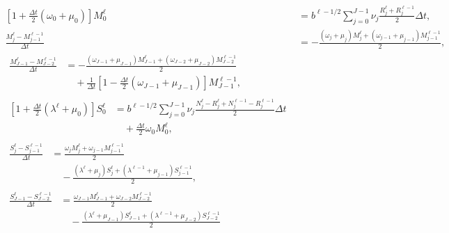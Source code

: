 \documentclass[USenglish]{article}
\begin{document}
\begin{subequations}
  \label{numerics_age_and_time_since_entry_structured_agg_tse}
  \begin{align}
    \left[1 + \frac{\Delta t}{2} (\omega_0 + \mu_0)\right] M_0^{\ell}
    &= b^{\ell - 1 / 2}
    \sum_{j = 0}^{J - 1} \nu_j \frac{R_j^{\ell} + R_j^{\ell - 1}}{2}
    \Delta t,
    \\
    \frac{M_j^{\ell} - M_{j - 1}^{\ell - 1}}{\Delta t}
    &=
    - \frac{(\omega_j + \mu_j) M_j^{\ell}
      + (\omega_{j - 1} + \mu_{j - 1}) M_{j - 1}^{\ell - 1}}
    {2},
    \\
    \begin{split}
      \frac{M_{J - 1}^{\ell} - M_{J - 2}^{\ell - 1}}{\Delta t}
      &= - \frac{(\omega_{J - 1} + \mu_{J - 1}) M_{J - 1}^{\ell}
        + (\omega_{J - 2} + \mu_{J - 2}) M_{J - 2}^{\ell - 1}}
      {2}
      \\ & \quad {}
      +  \frac{1}{\Delta t} \left[
        1 - \frac{\Delta t}{2} (\omega_{J - 1} + \mu_{J - 1})
      \right] M_{J - 1}^{\ell - 1},
    \end{split}
    \\
    \begin{split}
      \left[1 + \frac{\Delta t}{2} (\lambda^{\ell} + \mu_0)\right] S_0^{\ell}
      &= b^{\ell - 1 / 2}
      \sum_{j = 0}^{J - 1} \nu_j
      \frac{N_j^{\ell} - R_j^{\ell} + N_j^{\ell - 1} - R_j^{\ell - 1}}
      {2}
      \Delta t
      \\ & \quad {}
      + \frac{\Delta t}{2} \omega_0 M_0^{\ell},
    \end{split}
    \\
    \begin{split}
      \frac{S_j^{\ell} - S_{j - 1}^{\ell - 1}}{\Delta t}
      &= \frac{\omega_j M_j^{\ell}
        + \omega_{j - 1} M_{j - 1}^{\ell - 1}}
      {2}
      \\ & \quad {}
      - \frac{(\lambda^{\ell} + \mu_j) S_j^{\ell}
        + (\lambda^{\ell - 1} + \mu_{j - 1}) S_{j - 1}^{\ell - 1}}
      {2},
    \end{split}
    \\
    \begin{split}
      \frac{S_{J - 1}^{\ell} - S_{J - 2}^{\ell - 1}}{\Delta t}
      &= \frac{\omega_{J - 1} M_{J - 1}^{\ell}
        + \omega_{J - 2} M_{J - 2}^{\ell - 1}}
      {2}
      \\ & \quad {}
      - \frac{(\lambda^{\ell} + \mu_{J - 1}) S_{J - 1}^{\ell}
        + (\lambda^{\ell - 1} + \mu_{J - 2}) S_{J - 2}^{\ell - 1}}
      {2}

\end{split}
\end{align}
\end{subequations}
\end{document}
